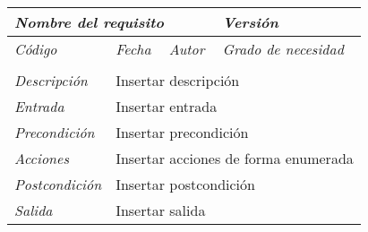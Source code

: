 \begin{tabular}{|p{3cm}|p{3cm}|p{3cm}|p{3cm}|}
\hline \multicolumn{3}{|p{9cm}|}{\textit{Nombre del requisito}} & \textit{Versi\'on} \\
\hline \textit{C\'odigo} & \textit{Fecha} & \textit{Autor} & \textit{Grado de necesidad} \\
& & & \\
\hline \textit{Descripci\'on} & \multicolumn{3}{|p{9cm}|}{Insertar descripci\'on} \\
\hline \textit{Entrada} & \multicolumn{3}{|p{9cm}|}{Insertar entrada} \\
\hline \textit{Precondici\'on} & \multicolumn{3}{|p{9cm}|}{Insertar precondici\'on} \\
\hline \textit{Acciones} & \multicolumn{3}{|p{9cm}|}{Insertar acciones de forma enumerada} \\
\hline \textit{Postcondici\'on} & \multicolumn{3}{|p{9cm}|}{Insertar postcondici\'on} \\
\hline \textit{Salida} & \multicolumn{3}{|p{9cm}|}{Insertar salida} \\ \hline
\end{tabular}